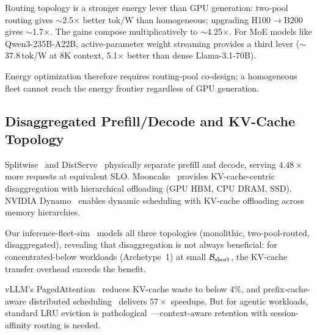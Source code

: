 Routing topology is a stronger energy lever than GPU generation: two-pool routing gives $\sim$2.5$\times$ better
tok/W than homogeneous; upgrading H100$\to$B200 gives
$\sim$1.7$\times$.  The gains compose multiplicatively to
$\sim$4.25$\times$.  For MoE models like Qwen3-235B-A22B,
active-parameter weight streaming provides a third lever
($\sim$37.8\,tok/W at 8K context, 5.1$\times$ better than dense
Llama-3.1-70B).

Energy optimization therefore requires routing-pool co-design; a
homogeneous fleet cannot reach the energy frontier regardless of GPU
generation.


\subsection{Disaggregated Prefill/Decode and KV-Cache Topology}
\label{sec:pool:disagg}

Splitwise~\cite{patel2024splitwise} and
DistServe~\cite{zhong2024distserve} physically separate prefill and
decode, serving $4.48\times$ more requests at equivalent SLO.
Mooncake~\cite{qin2025mooncake} provides KV-cache-centric
disaggregation with hierarchical offloading (GPU HBM, CPU DRAM, SSD).
NVIDIA Dynamo~\cite{nvidia2026dynamo} enables dynamic scheduling with
KV-cache offloading across memory hierarchies.

Our inference-fleet-sim~\cite{fleetsim2026} models all three
topologies (monolithic, two-pool-routed, disaggregated), revealing
that disaggregation is not always beneficial: for concentrated-below
workloads (Archetype~1) at small $\mathcal{B}_{\text{short}}$, the
KV-cache transfer overhead exceeds the benefit.

vLLM's PagedAttention~\cite{kwon2023vllm} reduces KV-cache waste to
below 4\%, and prefix-cache-aware distributed
scheduling~\cite{llmd2026kvcache} delivers $57\times$ speedups.  But
for agentic workloads, standard LRU eviction is
pathological~\cite{vllm2026rfc37003}---context-aware retention
with session-affinity routing is needed.


